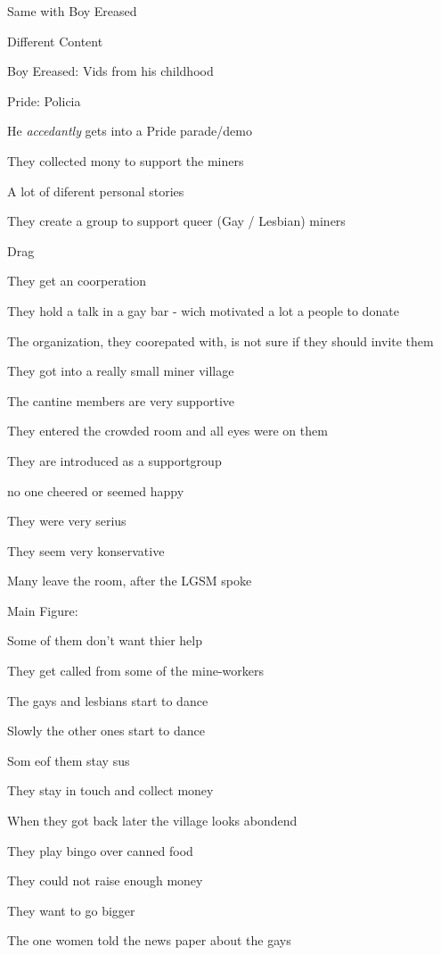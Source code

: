  \startitemize[packed]
  \item
    Same with Boy Ereased
  \item
    Different Content
  \item
    Boy Ereased: Vids from his childhood
  \item
    Pride: Policia
  \stopitemize
\item
  He {\em accedantly} gets into a Pride parade/demo
\item
  They collected mony to support the miners
\item
  A lot of diferent personal stories
\item
  They create a group to support queer (Gay / Lesbian) miners
\item
  Drag
\item
  They get an coorperation
\item
  They hold a talk in a gay bar - wich motivated a lot a people to
  donate
\item
  The organization, they coorepated with, is not sure if they should
  invite them
\item
  They got into a really small miner village
\item
  The cantine members are very supportive
\item
  They entered the crowded room and all eyes were on them
\item
  They are introduced as a supportgroup
\item
  no one cheered or seemed happy
\item
  They were very serius
\item
  They seem very konservative
\item
  Many leave the room, after the LGSM spoke
\item
  Main Figure: 
\item
  Some of them don't want thier help
\item
  They get called  from some of the mine-workers
\item
\item
  The gays and lesbians start to dance
\item
  Slowly the other ones start to dance
\item
  Som eof them stay sus
\item
\item
\item
  They stay in touch and collect money
\item
  When they got back later the village looks abondend
\item
  They play bingo over canned food
\item
  They could not raise enough money
\item
  They want to go bigger
\item
  The one women told the news paper about the gays
\item
\stopitemize


